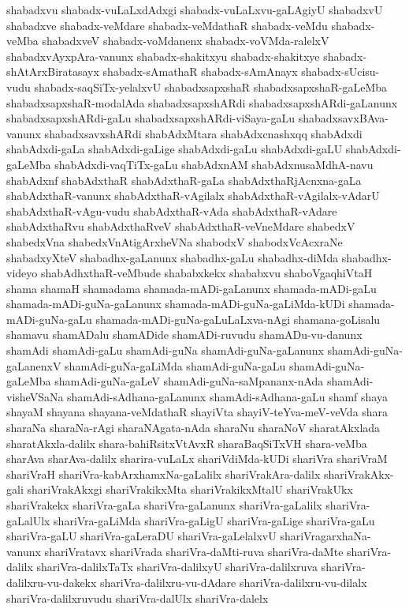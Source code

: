 {shabadxvu
shabadx-vuLaLxdAdxgi
shabadx-vuLaLxvu-gaLAgiyU
shabadxvU
shabadxve
shabadx-veMdare
shabadx-veMdathaR
shabadx-veMdu
shabadx-veMba
shabadxveV
shabadx-voMdanenx
shabadx-voVMda-ralelxV
shabadxvAyxpAra-vanunx
shabadx-shakitxyu
shabadx-shakitxye
shabadx-shAtArxBiratasayx
shabadx-sAmathaR
shabadx-sAmAnayx
shabadx-sUcisu-vudu
shabadx-saqSiTx-yelalxvU
shabadxsapxshaR
shabadxsapxshaR-gaLeMba
shabadxsapxshaR-modalAda
shabadxsapxshARdi
shabadxsapxshARdi-gaLanunx
shabadxsapxshARdi-gaLu
shabadxsapxshARdi-viSaya-gaLu
shabadxsavxBAva-vanunx
shabadxsavxshARdi
shabAdxMtara
shabAdxcnashxqq
shabAdxdi
shabAdxdi-gaLa
shabAdxdi-gaLige
shabAdxdi-gaLu
shabAdxdi-gaLU
shabAdxdi-gaLeMba
shabAdxdi-vaqTiTx-gaLu
shabAdxnAM
shabAdxnusaMdhA-navu
shabAdxnf
shabAdxthaR
shabAdxthaR-gaLa
shabAdxthaRjAcnxna-gaLa
shabAdxthaR-vanunx
shabAdxthaR-vAgilalx
shabAdxthaR-vAgilalx-vAdarU
shabAdxthaR-vAgu-vudu
shabAdxthaR-vAda
shabAdxthaR-vAdare
shabAdxthaRvu
shabAdxthaRveV
shabAdxthaR-veVneMdare
shabedxV
shabedxVna
shabedxVnAtigArxheVNa
shabodxV
shabodxVcAcxraNe
shabadxyXteV
shabadhx-gaLanunx
shabadhx-gaLu
shabadhx-diMda
shabadhx-videyo
shabAdhxthaR-veMbude
shababxkekx
shababxvu
shaboVgaqhiVtaH
shama
shamaH
shamadama
shamada-mADi-gaLanunx
shamada-mADi-gaLu
shamada-mADi-guNa-gaLanunx
shamada-mADi-guNa-gaLiMda-kUDi
shamada-mADi-guNa-gaLu
shamada-mADi-guNa-gaLuLaLxva-nAgi
shamana-goLisalu
shamavu
shamADalu
shamADide
shamADi-ruvudu
shamADu-vu-danunx
shamAdi
shamAdi-gaLu
shamAdi-guNa
shamAdi-guNa-gaLanunx
shamAdi-guNa-gaLanenxV
shamAdi-guNa-gaLiMda
shamAdi-guNa-gaLu
shamAdi-guNa-gaLeMba
shamAdi-guNa-gaLeV
shamAdi-guNa-saMpananx-nAda
shamAdi-visheVSaNa
shamAdi-sAdhana-gaLanunx
shamAdi-sAdhana-gaLu
shamf
shaya
shayaM
shayana
shayana-veMdathaR
shayiVta
shayiV-teYva-meV-veVda
shara
sharaNa
sharaNa-rAgi
sharaNAgata-nAda
sharaNu
sharaNoV
sharatAkxlada
sharatAkxla-dalilx
shara-bahiRsitxVtAvxR
sharaBaqSiTxVH
shara-veMba
sharAva
sharAva-dalilx
sharira-vuLaLx
shariVdiMda-kUDi
shariVra
shariVraM
shariVraH
shariVra-kabArxhamxNa-gaLalilx
shariVrakAra-dalilx
shariVrakAkx-gali
shariVrakAkxgi
shariVrakikxMta
shariVrakikxMtalU
shariVrakUkx
shariVrakekx
shariVra-gaLa
shariVra-gaLanunx
shariVra-gaLalilx
shariVra-gaLalUlx
shariVra-gaLiMda
shariVra-gaLigU
shariVra-gaLige
shariVra-gaLu
shariVra-gaLU
shariVra-gaLeraDU
shariVra-gaLelalxvU
shariVragarxhaNa-vanunx
shariVratavx
shariVrada
shariVra-daMti-ruva
shariVra-daMte
shariVra-dalilx
shariVra-dalilxTaTx
shariVra-dalilxyU
shariVra-dalilxruva
shariVra-dalilxru-vu-dakekx
shariVra-dalilxru-vu-dAdare
shariVra-dalilxru-vu-dilalx
shariVra-dalilxruvudu
shariVra-dalUlx
shariVra-dalelx
}
